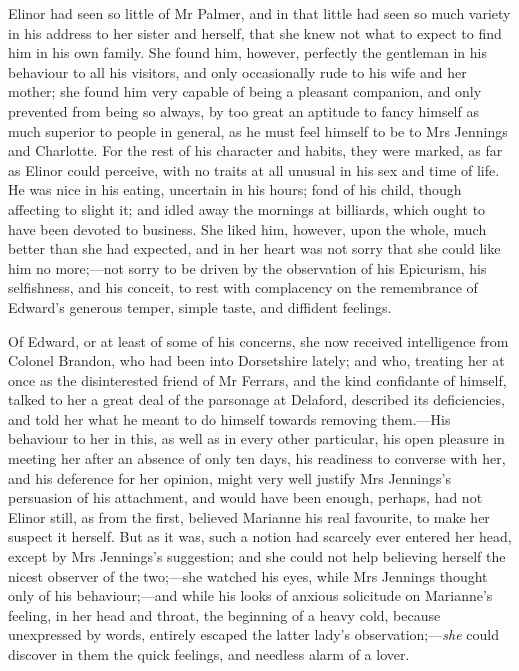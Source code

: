 Elinor had seen so little of Mr Palmer, and in that little had seen so much variety in his address to her sister and herself, that she knew not what to expect to find him in his own family. She found him, however, perfectly the gentleman in his behaviour to all his visitors, and only occasionally rude to his wife and her mother; she found him very capable of being a pleasant companion, and only prevented from being so always, by too great an aptitude to fancy himself as much superior to people in general, as he must feel himself to be to Mrs Jennings and Charlotte. For the rest of his character and habits, they were marked, as far as Elinor could perceive, with no traits at all unusual in his sex and time of life. He was nice in his eating, uncertain in his hours; fond of his child, though affecting to slight it; and idled away the mornings at billiards, which ought to have been devoted to business. She liked him, however, upon the whole, much better than she had expected, and in her heart was not sorry that she could like him no more;—not sorry to be driven by the observation of his Epicurism, his selfishness, and his conceit, to rest with complacency on the remembrance of Edward’s generous temper, simple taste, and diffident feelings.

Of Edward, or at least of some of his concerns, she now received intelligence from Colonel Brandon, who had been into Dorsetshire lately; and who, treating her at once as the disinterested friend of Mr Ferrars, and the kind confidante of himself, talked to her a great deal of the parsonage at Delaford, described its deficiencies, and told her what he meant to do himself towards removing them.—His behaviour to her in this, as well as in every other particular, his open pleasure in meeting her after an absence of only ten days, his readiness to converse with her, and his deference for her opinion, might very well justify Mrs Jennings’s persuasion of his attachment, and would have been enough, perhaps, had not Elinor still, as from the first, believed Marianne his real favourite, to make her suspect it herself. But as it was, such a notion had scarcely ever entered her head, except by Mrs Jennings’s suggestion; and she could not help believing herself the nicest observer of the two;—she watched his eyes, while Mrs Jennings thought only of his behaviour;—and while his looks of anxious solicitude on Marianne’s feeling, in her head and throat, the beginning of a heavy cold, because unexpressed by words, entirely escaped the latter lady’s observation;—\textit{she} could discover in them the quick feelings, and needless alarm of a lover.

